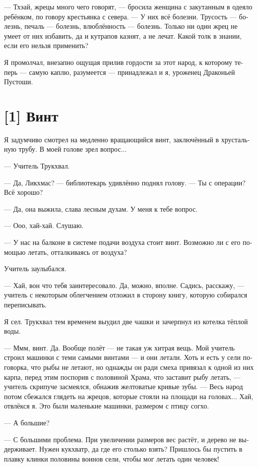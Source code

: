\documentclass[a4paper,12pt,fleqn]{book}\usepackage{cooltooltips}\usepackage{polyglossia}\setdefaultlanguage[babelshorthands=true]{russian}\setotherlanguage{english}\defaultfontfeatures{Ligatures=TeX,Mapping=tex-text} \usepackage{xcolor}\definecolor{lightgray}{HTML}{bbbbbb}\color{lightgray}\newcommand{\ml}[3]{\textenglish{\textcolor{black}{#3}}}
\begin{document}
{--- Тхэай, жрецы много чего говорят, --- бросила женщина с закутанным в одеяло ребёнком, по говору крестьянка с севера.
--- У них всё болезни.
Трусость --- болезнь, печаль --- болезнь, влюблённость --- болезнь.
Только ни один жрец не умеет от них избавить, да и кутрапов казнят, а не лечат.
Какой толк в знании, если его нельзя применить?

Я промолчал, внезапно ощущая прилив гордости за этот народ, к которому теперь --- самую каплю, разумеется --- принадлежал и я, уроженец Драконьей Пустоши.

\section{[1] Винт}

Я задумчиво смотрел на медленно вращающийся винт, заключённый в хрустальную трубу. В моей голове зрел вопрос...

--- Учитель Трукхвал.

--- Да, Ликхмас? --- библиотекарь удивлённо поднял голову.
--- Ты с операции?
Всё хорошо?

--- Да, она выжила, слава лесным духам.
У меня к тебе вопрос.

--- Ооо, хай-хай.
Слушаю.

--- У нас на балконе в системе подачи воздуха стоит винт.
Возможно ли с его помощью летать, отталкиваясь от воздуха?

Учитель заулыбался.

--- Хай, вон что тебя заинтересовало.
Да, можно, вполне.
Садись, расскажу, --- учитель с некоторым облегчением отложил в сторону книгу, которую собирался переписывать.

Я сел.
Трукхвал тем временем выудил две чашки и зачерпнул из котелка тёплой воды.

--- Ммм, винт.
Да.
Вообще полёт --- не такая уж хитрая вещь.
Мой учитель строил машинки с теми самыми винтами --- и они летали.
Хоть и есть у сели поговорка, что рыбы не летают, но однажды он ради смеха привязал к одной из них карпа, перед этим поспорив с половиной Храма, что заставит рыбу летать, --- учитель скрипуче засмеялся, обнажив желтоватые кривые зубы.
--- Весь народ потом сбежался глядеть на жрецов, которые стояли на площади на головах...
Хай, отвлёкся я.
Это были маленькие машинки, размером с птицу согхо.

--- А большие?

--- С большими проблема.
При увеличении размеров вес растёт, и дерево не выдерживает.
Нужен кукхватр, да где его столько взять?
Пришлось бы пустить в плавку клинки половины воинов сели, чтобы мог летать один человек!

}
\end{document}
